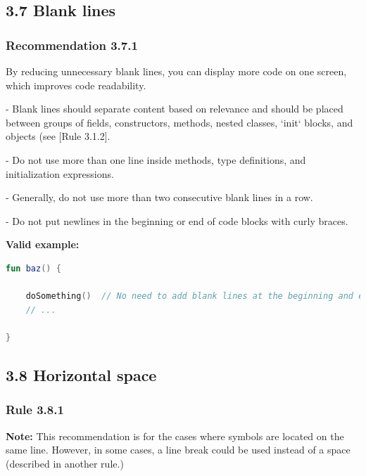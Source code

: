 {{\subsection*{\textbf{3.7 Blank lines}}

\subsubsection*{\textbf{Recommendation 3.7.1}}
\leavevmode\newline



By reducing unnecessary blank lines, you can display more code on one screen, which improves code readability.

- Blank lines should separate content based on relevance and should be placed between groups of fields, constructors, methods, nested classes, `init` blocks, and objects (see [Rule 3.1.2].

- Do not use more than one line inside methods, type definitions, and initialization expressions.

- Generally, do not use more than two consecutive blank lines in a row.

- Do not put newlines in the beginning or end of code blocks with curly braces.



\textbf{Valid example:}

\begin{lstlisting}[language=Kotlin]
fun baz() {

    doSomething()  // No need to add blank lines at the beginning and end of the code block
    // ...

}
\end{lstlisting}


\subsection*{\textbf{3.8 Horizontal space}}

\subsubsection*{\textbf{Rule 3.8.1}}
\leavevmode\newline



\textbf{Note:} This recommendation is for the cases where symbols are located on the same line. However, in some cases, a line break could be used instead of a space (described in another rule.)



}}
